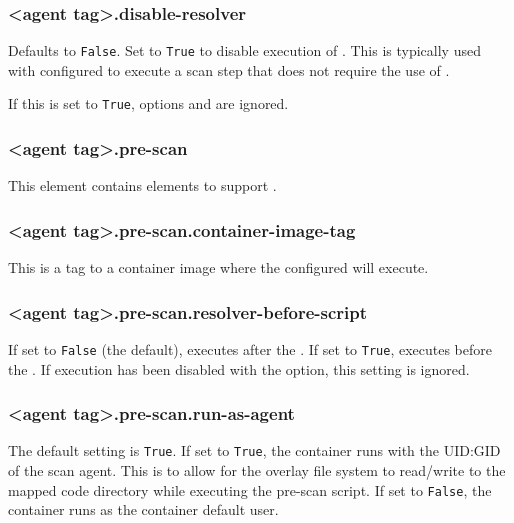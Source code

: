 \subsubsection{<agent tag>.disable-resolver}\label{sec:agent-disable-resolver}
Defaults to \texttt{False}.  Set to \texttt{True} to disable execution of \scaresolver.  This is typically used with 
 configured to execute a scan step that does not require the use of \scaresolver.

If this is set to \texttt{True}, options  and 
 are ignored.


\subsubsection{<agent tag>.pre-scan}\label{sec:agent-pre-scan}
This element contains elements to support .

\subsubsection{<agent tag>.pre-scan.container-image-tag}\label{sec:agent-pre-scan-container-image-tag}
This is a tag to a container image where the configured  will execute.

\subsubsection{<agent tag>.pre-scan.resolver-before-script}\label{sec:agent-pre-scan-resolver-before-script}
If set to \texttt{False} (the default), \scaresolver executes after the .
If set to \texttt{True}, \scaresolver executes before the . If \scaresolver
execution has been disabled with the  option, this setting is ignored.


\subsubsection{<agent tag>.pre-scan.run-as-agent}\label{sec:agent-pre-scan-run-as-agent}
The default setting is \texttt{True}.  If set to \texttt{True}, the container runs with the UID:GID of
the scan agent.  This is to allow for the overlay file system to read/write to the mapped code directory
while executing the pre-scan script.  If set to \texttt{False}, the container runs as the container default
user.

